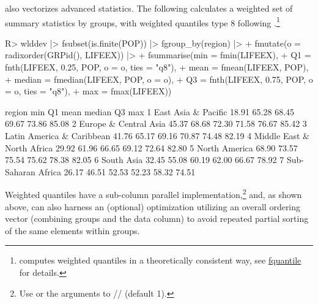 \documentclass[nojss]{jss} %
\newcommand{\class}[1]{`\code{#1}'}
\newcommand{\fct}[1]{\code{#1()}}
\begin{document}
 also vectorizes advanced statistics. The following calculates a weighted set of summary statistics by groups, with weighted quantiles type 8 following \citet{hyndman1996sample}.\footnote{ computes weighted quantiles in a theoretically consistent way, see \href{https://sebkrantz.github.io/collapse/reference/fquantile.html}{fquantile} for details.}
%
\begin{Schunk}
\begin{Sinput}
R> wlddev |> fsubset(is.finite(POP)) |> fgroup_by(region) |>
+    fmutate(o = radixorder(GRPid(), LIFEEX)) |>
+    fsummarise(min = fmin(LIFEEX),
+               Q1 = fnth(LIFEEX, 0.25, POP, o = o, ties = "q8"),
+               mean = fmean(LIFEEX, POP),
+               median = fmedian(LIFEEX, POP, o = o),
+               Q3 = fnth(LIFEEX, 0.75, POP, o = o, ties = "q8"),
+               max = fmax(LIFEEX))
\end{Sinput}
\begin{Soutput}
                      region   min    Q1  mean median    Q3   max
1        East Asia & Pacific 18.91 65.28 68.45  69.67 73.86 85.08
2      Europe & Central Asia 45.37 68.68 72.30  71.58 76.67 85.42
3  Latin America & Caribbean 41.76 65.17 69.16  70.87 74.48 82.19
4 Middle East & North Africa 29.92 61.96 66.65  69.12 72.64 82.80
5              North America 68.90 73.57 75.54  75.62 78.38 82.05
6                 South Asia 32.45 55.08 60.19  62.00 66.67 78.92
7         Sub-Saharan Africa 26.17 46.51 52.53  52.23 58.32 74.51
\end{Soutput}
\end{Schunk}
%
Weighted quantiles have a sub-column parallel implementation,\footnote{Use  or the  arguments to \fct{fnth}/\fct{fmedian}/\fct{fmode} (default 1).} and, as shown above, can also harness an (optional) optimization utilizing an overall ordering vector (combining groups and the data column) to avoid repeated partial sorting of the same elements within groups. %
%
%
%
\end{document}
